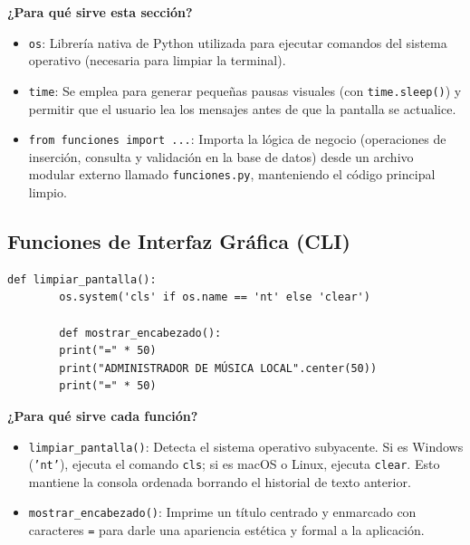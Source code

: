 \documentclass[11pt]{article}
\begin{document}
	\noindent\textbf{¿Para qué sirve esta sección?}
	\begin{itemize}[noitemsep,topsep=2pt]
		\item \texttt{os}: Librería nativa de Python utilizada para ejecutar comandos del sistema operativo (necesaria para limpiar la terminal).
		\item \texttt{time}: Se emplea para generar pequeñas pausas visuales (con \texttt{time.sleep()}) y permitir que el usuario lea los mensajes antes de que la pantalla se actualice.
		\item \texttt{from funciones import ...}: Importa la lógica de negocio (operaciones de inserción, consulta y validación en la base de datos) desde un archivo modular externo llamado \texttt{funciones.py}, manteniendo el código principal limpio.
	\end{itemize}
	
	\vspace{0.5cm}
	
	\subsection{Funciones de Interfaz Gráfica (CLI)}
	\begin{lstlisting}[style=pythonstyle]
		def limpiar_pantalla():
		os.system('cls' if os.name == 'nt' else 'clear')
		
		def mostrar_encabezado():
		print("=" * 50)
		print("ADMINISTRADOR DE MÚSICA LOCAL".center(50))
		print("=" * 50)
	\end{lstlisting}
	
	\noindent\textbf{¿Para qué sirve cada función?}
	\begin{itemize}[noitemsep,topsep=2pt]
		\item \texttt{limpiar\_pantalla()}: Detecta el sistema operativo subyacente. Si es Windows (\texttt{'nt'}), ejecuta el comando \texttt{cls}; si es macOS o Linux, ejecuta \texttt{clear}. Esto mantiene la consola ordenada borrando el historial de texto anterior.
		\item \texttt{mostrar\_encabezado()}: Imprime un título centrado y enmarcado con caracteres \texttt{=} para darle una apariencia estética y formal a la aplicación.
	\end{itemize}
	
	\vspace{0.5cm}
	
\end{document}
